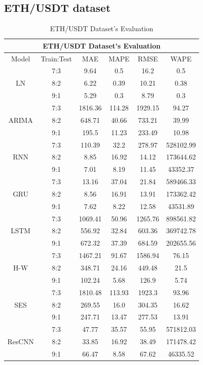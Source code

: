 \documentclass{ieeeojies}
\begin{document}
\subsection{ETH/USDT dataset}
\begin{table}[H]
    \centering
    \begin{tabular}{|c|c|c|c|c|c|}
         \hline
         \multicolumn{6}{|c|}{\textbf{ETH/USDT Dataset's Evaluation}}\\
         \hline
         \centering Model & Train:Test & MAE & MAPE & RMSE & WAPE \\ 
         \hline
         \multirow{3}{*}{LN} & 7:3 & 9.64 & 0.5 & 16.2 & 0.5 \\ & 8:2 & 6.22 & 0.39 & 10.21 & 0.38 \\ & 9:1 & 5.29 & 0.3 & 8.79 & 0.3 \\ 
         \hline
         \multirow{3}{*}{ARIMA} & 7:3 & 1816.36 & 114.28 & 1929.15 & 94.27 \\ & 8:2 & 648.71 & 40.66 & 733.21 & 39.99 \\ & 9:1 & 195.5 & 11.23 & 233.49 & 10.98 \\
         \hline
         \multirow{3}{*}{RNN} & 7:3 & 110.39 & 32.2 & 278.97 & 528102.99 \\ & 8:2 & 8.85 & 16.92 & 14.12 & 173644.62 \\ & 9:1 & 7.01 & 8.19 & 11.45 & 43352.37 \\
         \hline
         \multirow{3}{*}{GRU} & 7:3 & 13.16 & 37.04 & 21.84 & 589466.33 \\ & 8:2 & 8.56 & 16.91 & 13.91 & 173362.42 \\ & 9:1 & 7.62 & 8.22 & 12.58 & 43531.89 \\
         \hline
         \multirow{3}{*}{LSTM} & 7:3 & 1069.41 & 50.96 & 1265.76 & 898561.82 \\ & 8:2 & 556.92 & 32.84 & 603.36 & 369742.78 \\ & 9:1 & 672.32 & 37.39 & 684.59 & 202655.56 \\
         \hline
         \multirow{3}{*}{H-W} & 7:3 & 1467.21 & 91.67 & 1586.94 & 76.15 \\ & 8:2 & 348.71 & 24.16 & 449.48 & 21.5 \\ & 9:1 & 102.24 & 5.68 & 126.9 & 5.74 \\
         \hline
         \multirow{3}{*}{SES} & 7:3 & 1810.48 & 113.93 & 1923.3 & 93.96 \\ & 8:2 & 269.55 & 16.0 & 304.35 & 16.62 \\ & 9:1 & 247.71 & 13.47 & 277.53 & 13.91 \\
         \hline
         \multirow{3}{*}{ResCNN} & 7:3 & 47.77 & 35.57 & 55.95 & 571812.03 \\ & 8:2 & 33.85 & 16.92 & 38.49 & 171478.42 \\ & 9:1 & 66.47 & 8.58 & 67.62 & 46335.52 \\
         \hline
    \end{tabular}
    \caption{ETH/USDT Dataset's Evaluation}
    \label{ethresult}
\end{table}
\end{document}
